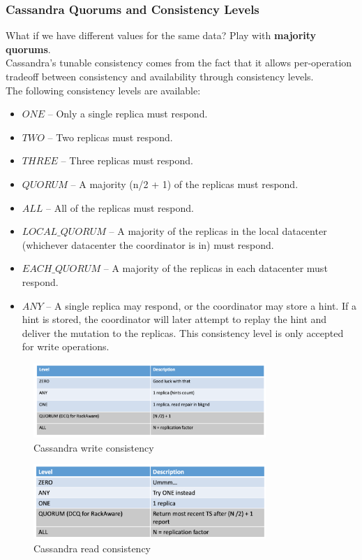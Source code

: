 \documentclass[10pt,a4paper]{article}
\begin{document}
\subsubsection{Cassandra Quorums and Consistency Levels}
What if we have different values for the same data? Play with \textbf{majority quorums}. \\
Cassandra’s tunable consistency comes from the fact that it allows per-operation tradeoff between consistency and availability through consistency levels.  \\
The following consistency levels are available:
\begin{itemize}
	\item $ONE$ – Only a single replica must respond.
	\item $TWO$ – Two replicas must respond.
	\item $THREE$ – Three replicas must respond.
	\item $QUORUM$ – A majority (n/2 + 1) of the replicas must respond.
	\item $ALL$ – All of the replicas must respond.
	\item $LOCAL\_QUORUM$ – A majority of the replicas in the local datacenter (whichever datacenter the coordinator is in) must respond.
	\item $EACH\_QUORUM$ – A majority of the replicas in each datacenter must respond.
	\item $ANY$ – A single replica may respond, or the coordinator may store a hint. If a hint is stored, the coordinator will later attempt to replay the hint and deliver the mutation to the replicas. This consistency level is only accepted for write operations.
\end{itemize}
\begin{figure}[ht!]
 \hfill \includegraphics[width=250pt]{images/cassandra-write-consistency.png}\hspace*{\fill}
 \caption{Cassandra write consistency}
\end{figure}
\begin{figure}[ht!]
 \hfill \includegraphics[width=250pt]{images/cassandra-read-consistency.png}\hspace*{\fill}
  \caption{Cassandra read consistency}
\end{figure} 
\pagebreak
\end{document}
